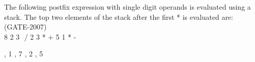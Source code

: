 \begin{questyle}
  \question  The following postfix expression with single digit operands is evaluated using a stack.
             The top two elements of the stack after the first * is evaluated are: (GATE-2007) \\
             8 2 3 \( \hat{} \)  / 2 3 * + 5 1 * -

  \begin{choices}
    , 1
    , 7
    , 2
    , 5
  \end{choices}
\end{questyle}



































